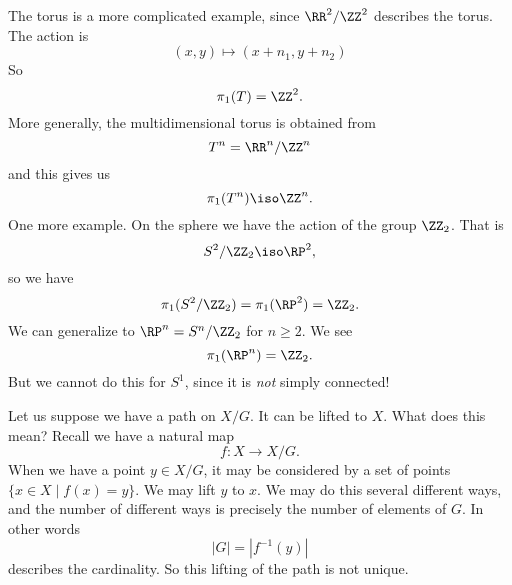 The torus is a more complicated example, since $\RR^2/\ZZ^2$
describes the torus.
The action is
\begin{equation}
(x,y)\mapsto(x+n_1,y+n_2)
\end{equation}
So
\begin{equation}
\pi_{1}(T)=\ZZ^{2}.
\end{equation}
More generally, the multidimensional torus is obtained from
\begin{equation}
T^{n}=\RR^n/\ZZ^n
\end{equation}
and this gives us
\begin{equation}
\pi_{1}(T^{n})\iso\ZZ^n.
\end{equation}
One more example. On the sphere we have the action of the group
$\ZZ_2$. That is
\begin{equation}
S^2/\ZZ_2\iso\RP^2,
\end{equation}
so we have
\begin{equation}
\pi_{1}(S^{2}/\ZZ_{2})=\pi_{1}(\RP^{2})=\ZZ_{2}.
\end{equation}
We can generalize to $\RP^{n}=S^{n}/\ZZ_{2}$ for $n\geq2$. We see
\begin{equation}
\pi_{1}(\RP^{n})=\ZZ_{2}.
\end{equation}
But we cannot do this for $S^1$, since it is \emph{not} simply
connected! 

Let us suppose we have a path on $X/G$. It can be lifted to
$X$. What does this mean? Recall we have a natural map
\begin{equation}
f\colon X\to X/G.
\end{equation}
When we have a point $y\in X/G$, it may be considered by a set of points
$\{x\in X\mid f(x)=y\}$. We may lift $y$ to $x$. We may do this
several different ways, and the number of different ways is
precisely the number of elements of $G$. In other words
\begin{equation}
|G|=|f^{-1}(y)|
\end{equation}
describes the cardinality. So this lifting of the path is not
unique. 

